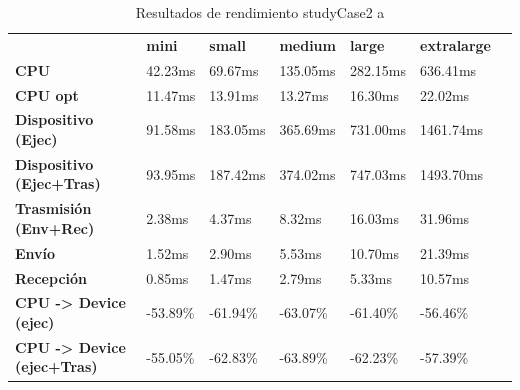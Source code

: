 \begin{table}[H]
    \centering
    \begin{tabular}{lllllll}
    \rowcolor[HTML]{DAE8FC} \ &  \textbf{mini} &  \textbf{small} &  \textbf{medium} &  \textbf{	large} &  \textbf{	extralarge} \\
    \cellcolor[HTML]{DAE8FC} \textbf{CPU} & 42.23ms & 69.67ms & 135.05ms & 	282.15ms & 	636.41ms \\
    \rowcolor[HTML]{EFEFEF} \cellcolor[HTML]{DAE8FC} \textbf{CPU opt} & 11.47ms & 13.91ms & 13.27ms & 	16.30ms & 	22.02ms \\
    \cellcolor[HTML]{DAE8FC} \textbf{Dispositivo (Ejec)} & 91.58ms & 183.05ms & 365.69ms & 	731.00ms & 	1461.74ms \\
    \rowcolor[HTML]{EFEFEF} \cellcolor[HTML]{DAE8FC} \textbf{Dispositivo (Ejec+Tras)} & 93.95ms & 187.42ms & 374.02ms & 	747.03ms & 	1493.70ms \\
    \cellcolor[HTML]{DAE8FC} \textbf{Trasmisión (Env+Rec)} & 2.38ms & 4.37ms & 8.32ms & 	16.03ms & 	31.96ms \\
    \rowcolor[HTML]{EFEFEF} \cellcolor[HTML]{DAE8FC} \textbf{Envío} & 1.52ms & 2.90ms & 5.53ms & 	10.70ms & 	21.39ms \\
    \cellcolor[HTML]{DAE8FC} \textbf{Recepción} & 0.85ms & 1.47ms & 2.79ms & 	5.33ms & 	10.57ms \\
    \rowcolor[HTML]{EFEFEF} \cellcolor[HTML]{DAE8FC} \textbf{CPU -> Device (ejec)} & -53.89\% & -61.94\% & -63.07\% & 	-61.40\% & 	-56.46\% \\
    \cellcolor[HTML]{DAE8FC} \textbf{CPU -> Device (ejec+Tras)} & -55.05\% & -62.83\% & -63.89\% & 	-62.23\% & 	-57.39\% \\
    \end{tabular}
    \caption[Resultados de rendimiento studyCase2 a]{{Resultados de rendimiento studyCase2 a}}
    \label{table_test_studyCase2_a_hw_performanceResults}
\end{table}